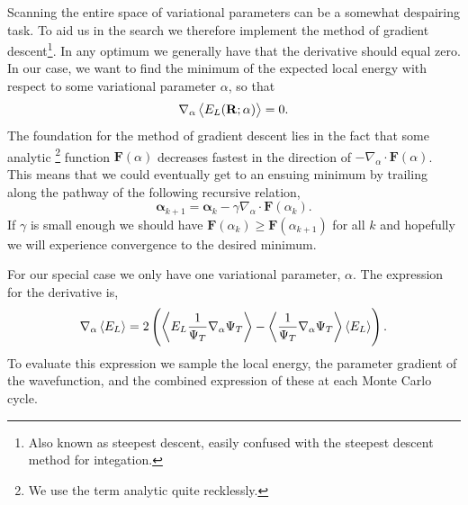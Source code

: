 \documentclass[
    a4paper, aps, twocolumn, floatfix, superscriptaddress, nofootinbib]{revtex4-1}
\newcommand{\vf}{\mathbf}
\newcommand{\vfg}{\boldsymbol}
\newcommand{\1}{\mathds{1}}
\begin{document}
            Scanning the entire space of variational parameters can be a
            somewhat despairing task. To aid us in the search we therefore
            implement the method of gradient descent\footnote{Also known as
            steepest descent, easily confused with the steepest descent method
            for integation.}. In any optimum we generally have that the
            derivative should equal zero. In our case, we want to find the
            minimum of the expected local energy with respect to some
            variational parameter $\alpha$, so that
            \begin{equation}
                \nabla_\alpha \expval{E_L(\mathbf{R}; \alpha)} = 0.
            \end{equation}
            The foundation for  the method of gradient descent lies in the fact
            that some analytic \footnote{We use the term analytic quite
            recklessly.} function $\vf{F}(\alpha)$ decreases fastest in the direction
            of $-\nabla_\alpha\cdot\vf{F}(\alpha)$. This means that we could eventually
            get to an ensuing minimum by trailing along the pathway of the
            following recursive relation,
            \begin{equation}
                \vfg{\alpha}_{k+1}
                = \vfg{\alpha}_k - \gamma \nabla_{\alpha}\cdot \vf{F}(\alpha_k).
                \label{eq:parameter_difference}
            \end{equation}
            If $\gamma$ is small enough we should have $\vf{F}(\alpha_k) \geq
            \vf{F}(\alpha_{k+1})$ for all $k$ and hopefully we will experience
            convergence to the desired minimum.

            For our special case we only have one variational parameter,
            $\alpha$. The expression for the derivative is,
            \begin{align}
                \nabla_{\alpha}\expval{E_L}
                =
                2\left(
                    \expval{E_L\frac{1}{\Psi_T}\nabla_{\alpha}\Psi_T}
                    - \expval{\frac{1}{\Psi_T} \nabla_{\alpha}\Psi_T}
                    \expval{E_L}
                \right).
                \label{eq:variational_parameter_gradient}
            \end{align}
            To evaluate this expression we sample the local energy, the
            parameter gradient of the wavefunction, and the combined expression
            of these at each Monte Carlo cycle.
\end{document}
